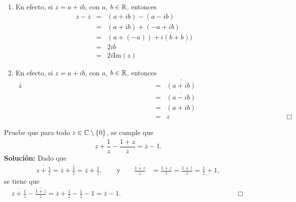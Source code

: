 \begin{enumerate}
\begin{eqnarray*}
	&=&(a+a)+i(b-b) \\
	&=&2a\\
	&=&2\mbox{Re}(z)
	\end{eqnarray*}
	\item
	En efecto, si $z=a+ib$, con $a$, $b\in\mathbb{R}$,  entonces
	\begin{eqnarray*}
	z - \overline{z}&=&(a+ib )-(a-ib)\\
	&=&(a+ib)+(-a+ib)\\
	&=&(a+(-a))+i(b+b))\\
	&=&2ib \\
	&=&2 i \mbox{Im}(z)
	\end{eqnarray*}
	\item
	En efecto, si $z=a+ib$, con $a$, $b\in\mathbb{R}$,  entonces
	\begin{eqnarray*}
	\overline{\overline{z}}&=&\overline{\overline{(a+ib)}}\\
	&=&\overline{(a-ib)}\\
	&=&(a+ib)\\
	\hspace{8cm}&=&z 	\hspace{7cm} \Box
	\end{eqnarray*}
\end{enumerate}


		
		\vspace{.5cm}
		
 \begin{ejercicio}{}{}
 Pruebe que para todo $z \in \mathbb{C}\setminus\{0\}$, se cumple que
 			\[
 				\overline{z + \frac 1 z} - \overline{\frac{1+z}{z}} = \overline{z}-1.
 			\]
 			\textbf{Soluci\'on:} Dado que
 			\begin{align*}
 				\overline{z + \frac 1 z} = \overline{z} + \overline{\frac 1 z}
 					= \overline{z} + \frac{1}{\overline{z}},\qquad\textrm{y}\qquad 
 				\overline{\frac{1+z}{z}} &= 
 					\frac{\overline{1+z}}{\overline{z}} = \frac{1 + \overline{z}}{\overline{z}}
 					= \frac{1}{\overline{z}} + 1,
 			\end{align*}
 			se tiene que 
			\begin{align*}
 				\overline{z + \frac 1 z} - \overline{\frac{1+z}{z}} =
 					\overline{z} + \frac{1}{\overline{z}} - \frac{1}{\overline{z}} - 1
 					= \overline{z} - 1.  	\hspace{7cm} \Box
 			\end{align*}
 \end{ejercicio}


%
%

